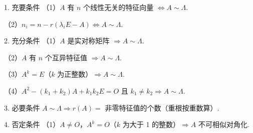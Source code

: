 


\begin{fcard}{1. 充要条件}
（1）$A$ 有 $n$ 个线性无关的特征向量 $\iff A\sim\Lambda$.

（2）$n_i=n-r(\lambda_i E-A)\iff A\sim\Lambda$.
\end{fcard}


\begin{fcard}{2. 充分条件}
（1）$A$ 是实对称矩阵 $\Rightarrow A\sim\Lambda$.

（2）$A$ 有 $n$ 个互异特征值 $\Rightarrow A\sim\Lambda$.

（3）$A^k=E$（$k$ 为正整数）$\Rightarrow A\sim\Lambda$.

（4）$A^2-(k_1+k_2)A+k_1k_2E=O$ 且 $k_1\ne k_2\Rightarrow A\sim\Lambda$.
\end{fcard}



\begin{fcard}{3. 必要条件}
$A\sim\Lambda\Rightarrow r(A)=$ 非零特征值的个数（重根按重数算）.
\end{fcard}


\begin{fcard}{4. 否定条件}
（1）$A\ne O$，$A^k=O$（$k$ 为大于 1 的整数）$\Rightarrow A$ 不可相似对角化.
\end{fcard}

